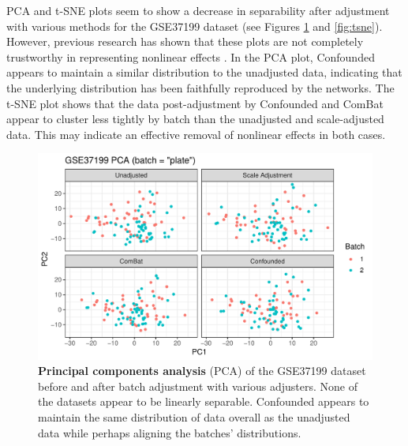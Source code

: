 \documentclass[notitlepage]{article}
\begin{document}
PCA and t-SNE plots seem to show a decrease in separability after adjustment with various methods for the GSE37199 dataset (see Figures \ref{fig:pca} and \ref{fig:tsne}).
However, previous research has shown that these plots are not completely trustworthy in representing nonlinear effects \cite{dayton_classifying_2017-1}.
In the PCA plot, Confounded appears to maintain a similar distribution to the unadjusted data, indicating that the underlying distribution has been faithfully reproduced by the networks.
The t-SNE plot shows that the data post-adjustment by Confounded and ComBat appear to cluster less tightly by batch than the unadjusted and scale-adjusted data.
This may indicate an effective removal of nonlinear effects in both cases.

\begin{figure}
	\centering
	\includegraphics[width=\columnwidth]{figures/final/pca.pdf}
	\caption{\textbf{Principal components analysis} (PCA) of the GSE37199 dataset before and after batch adjustment with various adjusters.
	None of the datasets appear to be linearly separable.
	Confounded appears to maintain the same distribution of data overall as the unadjusted data while perhaps aligning the batches' distributions.}
	\label{fig:pca}
\end{figure}
\end{document}
